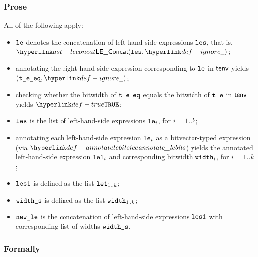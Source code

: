 \subsubsection{Prose}
All of the following apply:
\begin{itemize}
  \item $\vle$ denotes the concatenation of left-hand-side expressions $\les$, that is, \\ $\LEConcat(\les, \Ignore)$;
  \item annotating the right-hand-side expression corresponding to $\vle$ in $\tenv$ yields \\ $(\vteeq, \Ignore)$\ProseOrTypeError;
  \item checking whether the bitwidth of $\vteeq$ equals the bitwidth of $\vte$ in $\tenv$ yields $\True$\ProseOrTypeError;
  \item $\les$ is the list of left-hand-side expressions $\vle_i$, for $i=1..k$;
  \item annotating each left-hand-side expression $\vle_i$ as a bitvector-typed expression (via $\annotatelebitslice$)
        yields the annotated left-hand-side expression $\vleone_i$ and corresponding bitwidth $\width_i$, for $i=1..k$;
  \item $\lesone$ is defined as the list $\vleone_{1..k}$;
  \item $\widths$ is defined as the list $\width_{1..k}$;
  \item $\newle$ is the concatenation of left-hand-side expressions $\lesone$ with corresponding list of widths $\widths$.
\end{itemize}
\subsubsection{Formally}
\begin{mathpar}
\end{mathpar}

